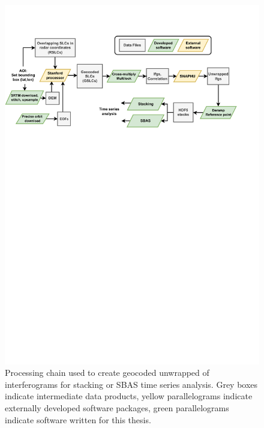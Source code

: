 \begin{figure}
	\centering
	\includegraphics[width=\textwidth]{figures/chapter2-sar/processing-flow.pdf}
	\caption[Diagram of InSAR processing chain]{
	Processing chain used to create geocoded unwrapped of interferograms for stacking or SBAS time series analysis. Grey boxes indicate intermediate data products, yellow parallelograms indicate externally developed software packages, green parallelograms indicate software written for this thesis.
}
	\label{fig:ch2-processing}
\end{figure}


